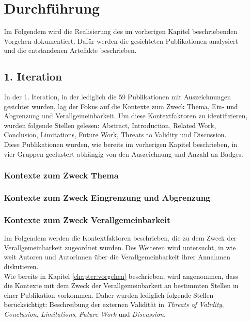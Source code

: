 \chapter{Durchführung}
\label{chapter:impl}
Im Folgendem wird die Realisierung des im vorherigen Kapitel beschriebenden Vorgehen dokumentiert.
Dafür werden die gesichteten Publikationen analysiert und die entstandenen Artefakte beschrieben.

\section{1. Iteration}
In der 1. Iteration, in der lediglich die 59 Publikationen mit Auszeichnungen gesichtet wurden,
lag der Fokus auf die Kontexte zum Zweck Thema, Ein- und Abgrenzung und Verallgemeinbarkeit.
Um diese Kontextfaktoren zu identifizieren, wurden folgende Stellen gelesen:
Abstract, Introduction, Related Work, Conclusion, Limitations, Future Work, Threats to Validity und Discussion. \\

Diese Publikationen wurden, wie bereits im vorherigen Kapitel beschrieben, in vier Gruppen geclustert abhängig von den Auszeichnung und Anzahl an Badges. \\


\subsection{Kontexte zum Zweck Thema}


\subsection{Kontexte zum Zweck Eingrenzung und Abgrenzung}

\clearpage
\subsection{Kontexte zum Zweck Verallgemeinbarkeit}

Im Folgendem werden die Kontextfaktoren beschrieben,
die zu dem Zweck der Verallgemeinbarkeit zugeordnet wurden.
Des Weiteren wird untersucht, in wie weit Autoren und Autorinnen über die Verallgemeinbarkeit ihrer Annahmen diskutieren. \\

Wie bereits in Kapitel \ref{chapter:vorgehen} beschrieben, wird angenommen, dass die Kontexte mit dem Zweck der Verallgemeinbarkeit
an bestimmten Stellen in einer Publikation vorkommen. Daher wurden lediglich folgende Stellen berücksichtigt:
Beschreibung der externen Validität in \textit{Threats of Validity}, \textit{Conclusion}, \textit{Limitations}, \textit{Future Work} und \textit{Discussion}. \\

